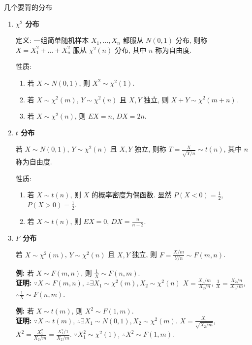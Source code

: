 \documentclass[padp]{ExBook}
\begin{document}
几个要背的分布
\begin{enumerate}[label=\arabic*.]
\item \textbf{$\chi^2$ 分布}

定义: 一组简单随机样本 $X_1, \dots, X_n$ 都服从 $N(0,1)$ 分布,
则称 $X = X_1^2 + \dots + X_n^2$ 服从 $\chi^2(n)$ 分布,
其中 $n$ 称为自由度.

性质:
\begin{enumerate}[label=\arabic*.]
    \item 若 $X \sim N(0,1)$, 则 $X^2 \sim \chi^2(1)$.
    \item 若 $X \sim \chi^2(m)$, $Y \sim \chi^2(n)$ 且 $X, Y$ 独立, 则 $X+Y \sim \chi^2(m+n)$.
    \item 若 $X \sim \chi^2(n)$, 则 $EX=n$, $DX=2n$.
\end{enumerate}

\item \textbf{$t$ 分布}

若 $X \sim N(0,1)$, $Y \sim \chi^2(n)$ 且 $X, Y$ 独立,
则称 $T = \frac{X}{\sqrt{Y/n}} \sim t(n)$,
其中 $n$ 称为自由度.

性质:
\begin{enumerate}[label=\arabic*.]
    \item 若 $X \sim t(n)$, 则 $X$ 的概率密度为偶函数.
    显然 $P(X<0) = \frac{1}{2}$, $P(X>0) = \frac{1}{2}$.
    \item 若 $X \sim t(n)$, 则 $EX=0$, $DX=\frac{n}{n-2}$.
\end{enumerate}

\item \textbf{$F$ 分布}

若 $X \sim \chi^2(m)$, $Y \sim \chi^2(n)$ 且 $X, Y$ 独立,
则 $F = \frac{X/m}{Y/n} \sim F(m,n)$.

\textbf{例:} 若 $X \sim F(m,n)$, 则 $\frac{1}{X} \sim F(n,m)$. \\
\textbf{证明:}
$\because X \sim F(m,n)$, $\therefore \exists X_1 \sim \chi^2(m), X_2 \sim \chi^2(n)$
$X = \frac{X_1/m}{X_2/n}$,
$\frac{1}{X} = \frac{X_2/n}{X_1/m}$,
$\therefore \frac{1}{X} \sim F(n,m)$.

\vspace{1em} %

\textbf{例:} 若 $X \sim t(m)$, 则 $X^2 \sim F(1,m)$. \\
\textbf{证明:}
$\because X \sim t(m)$, $\therefore \exists X_1 \sim N(0,1), X_2 \sim \chi^2(m)$.
$X = \frac{X_1}{\sqrt{X_2/m}}$,
$X^2 = \frac{X_1^2}{X_2/m} = \frac{X_1^2/1}{X_2/m}$.
$\because X_1^2 \sim \chi^2(1)$,
$\therefore X^2 \sim F(1,m)$.

\end{enumerate}
\end{document}
